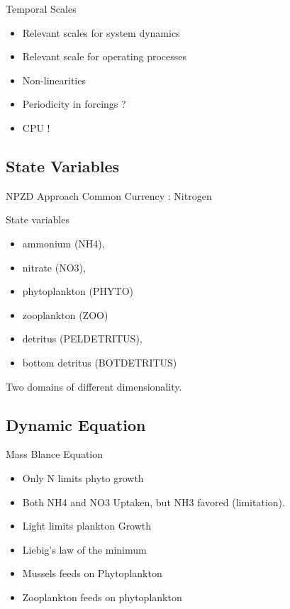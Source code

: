 \documentclass[final,xcolor=dvipsnames]{beamer}
\begin{document}
\begin{frame}
\begin{block}{Temporal Scales}
\begin{itemize}[<+->]
    \item Relevant scales for system dynamics
    \item Relevant scale for operating processes
    \item Non-linearities
    \item Periodicity in forcings ?  
    \item CPU ! 
\end{itemize}
\end{block}

\end{frame}



\subsection{State Variables}
\begin{frame}
NPZD Approach
Common Currency : Nitrogen
\begin{exampleblock}{State variables}
\begin{itemize}
    \item ammonium (NH4),
    \item nitrate (NO3),
    \item phytoplankton (PHYTO)
    \item zooplankton (ZOO)
    \item detritus (PELDETRITUS),
    \item bottom detritus (BOTDETRITUS)
\end{itemize} 
\end{exampleblock}

\begin{exampleblock}
Two domains of different dimensionality.
\end{exampleblock}
\end{frame}

\subsection{Dynamic Equation}
\begin{frame}
\begin{block}{Mass Blance Equation}
\begin{itemize}
    \item Only N limits phyto growth
    \item Both NH4 and NO3 Uptaken, but NH3 favored (limitation).
    \item Light limits plankton Growth  
    \item Liebig's law of the minimum
    \item Mussels feeds on Phytoplankton
    \item Zooplankton feeds on phytoplankton
\end{itemize} 
\end{block}
\end{frame}
\end{document}
